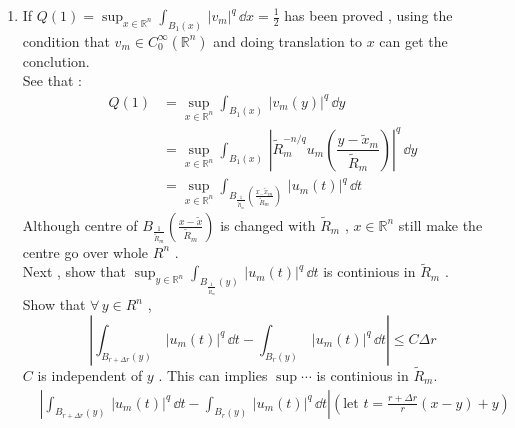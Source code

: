 \solution

\begin{enumerate}
    \item {}
    If $Q(1)=\sup_{x\in\mathbb{R}^n}
    \int_{B_1(x)}\,
    |v_m|^q
    \,\dd x
    =\frac{1}{2}$
    has been proved , using the condition that $v_m\in C_0^{\infty}(\mathbb{R}^n)$ and doing translation to $x$ can get the conclution.
    \\
    See that :
    \begin{equation*}
    \begin{aligned}
    Q(1)
    &=
    \sup_{x\in\mathbb{R}^n}
    \int_{B_1(x)}\,
    |v_m(y)|^q
    \,\dd y
    \\
    &=
    \sup_{x\in\mathbb{R}^n}
    \int_{B_1(x)}\,
    |
    \tilde{R}_m^{-n/q}
    u_m
    \left(
        \dfrac{y-\tilde{x}_m}
        {\tilde{R}_m}
    \right)
    |^q
    \,\dd y
    \\
    &=
    \sup_{x\in\mathbb{R}^n}
    \int_{
        B_{\frac{1}{\tilde{R}_m}}
        (\frac{x_-\tilde{x}_m}{\tilde{R}_m})
    }\,
        |u_m(t)|^q
    \,\dd t
    {}
    \end{aligned}
    \end{equation*}
    Although centre of $B_{
        \frac{1}{\tilde{R}_m}
    }
    \left(
        \frac{x-\tilde{x}}{\tilde{R}_m}
    \right)
    $ is changed with $\tilde{R}_m$ , $x\in \mathbb{R}^n$ still make the centre go over whole $R^n$ .
    \\
    Next , show that $\sup_{y\in \mathbb{R}^n}
    \int_{B_{\frac{1}{\tilde{R}_m}}(y)}\,
    |u_m(t)|^q
    \,\dd t
    $ is continious in $\tilde{R}_m$ .
    \\
    Show that $\forall \, y\in R^n$ ,
    \begin{equation*}
        \left|
        \int_{B_{
        r+\Delta r
        }(y)
        }\,
        |u_m(t)|^q
        \,\dd t
        -
        \int_{
            B_{r}(y)
        }\,
        |u_m(t)|^q
        \,\dd t
        \right|
        \leq C\Delta r
    \end{equation*}
    $C$ is independent of $y$ . This can implies $\sup\cdots$ is continious in $\tilde{R}_m$.
    \begin{equation*}
    \begin{aligned}
    &    \left|
    \int_{B_{
    r+\Delta r
    }(y)
    }\,
    |u_m(t)|^q
    \,\dd t
    -
    \int_{
        B_{r}(y)
    }\,
    |u_m(t)|^q
    \,\dd t
    \right|
    (\text{let $t=\frac{r+\Delta r}{r} (x-y)+y$})
    \\

\end{aligned}
\end{equation*}
\end{enumerate}
